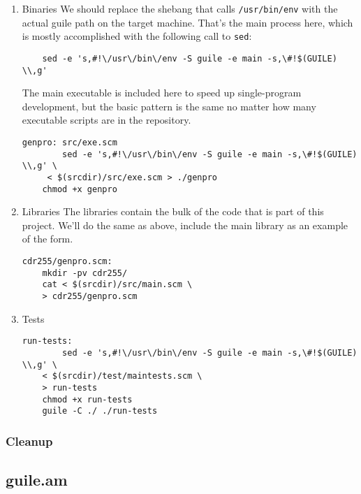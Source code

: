 \documentclass[11pt]{article}
\begin{document}
\begin{enumerate}
\item Binaries
\label{sec:orge569ec7}
We should replace the shebang that calls \texttt{/usr/bin/env} with the actual guile
path on the target machine. That's the main process here, which is mostly
accomplished with the following call to \texttt{sed}:

\begin{verbatim}
	sed -e 's,#!\/usr\/bin\/env -S guile -e main -s,\#!$(GUILE) \\,g'
\end{verbatim}

The main executable is included here to speed up single-program development, but
the basic pattern is the same no matter how many executable scripts are in the
repository.

\begin{verbatim}
genpro: src/exe.scm
		sed -e 's,#!\/usr\/bin\/env -S guile -e main -s,\#!$(GUILE) \\,g' \
	 < $(srcdir)/src/exe.scm > ./genpro
	chmod +x genpro
\end{verbatim}

\item Libraries
\label{sec:org4518114}
The libraries contain the bulk of the code that is part of this project. We'll
do the same as above, include the main library as an example of the form.

\begin{verbatim}
cdr255/genpro.scm:
	mkdir -pv cdr255/
	cat < $(srcdir)/src/main.scm \
	> cdr255/genpro.scm
\end{verbatim}

\item Tests
\label{sec:org89e45d7}
\begin{verbatim}
run-tests:
		sed -e 's,#!\/usr\/bin\/env -S guile -e main -s,\#!$(GUILE) \\,g' \
	< $(srcdir)/test/maintests.scm \
	> run-tests
	chmod +x run-tests
	guile -C ./ ./run-tests
\end{verbatim}
\end{enumerate}
\subsubsection{Cleanup}
\label{sec:orgd05d74a}

\subsection{guile.am}
\label{sec:orgd1a3f10}
\end{document}
